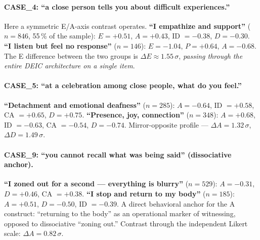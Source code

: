\paragraph{CASE\_4: ``a close person tells you about difficult experiences.''} Here a symmetric E/A-axis contrast operates. \textbf{``I empathize and support''} ($n = 846$, 55\,\% of the sample): $E = +0.51$, $A = +0.43$, ID $= -0.38$, $D = -0.30$. \textbf{``I listen but feel no response''} ($n = 146$): $E = -1.04$, $P = +0.64$, $A = -0.68$. The E difference between the two groups is $\Delta E \approx 1.55\,\sigma$, \emph{passing through the entire DEIC architecture on a single item}.

\paragraph{CASE\_5: ``at a celebration among close people, what do you feel.''} \textbf{``Detachment and emotional deafness''} ($n = 285$): $A = -0.64$, ID $= +0.58$, CA $= +0.65$, $D = +0.75$. \textbf{``Presence, joy, connection''} ($n = 348$): $A = +0.68$, ID $= -0.63$, CA $= -0.54$, $D = -0.74$. Mirror-opposite profile --- $\Delta A = 1.32\,\sigma$, $\Delta D = 1.49\,\sigma$.

\paragraph{CASE\_9: ``you cannot recall what was being said'' (dissociative anchor).} \textbf{``I zoned out for a second --- everything is blurry''} ($n = 529$): $A = -0.31$, $D = +0.46$, CA $= +0.38$. \textbf{``I stop and return to my body''} ($n = 185$): $A = +0.51$, $D = -0.50$, ID $= -0.39$. A direct behavioral anchor for the A construct: ``returning to the body'' as an operational marker of witnessing, opposed to dissociative ``zoning out.'' Contrast through the independent Likert scale: $\Delta A = 0.82\,\sigma$.

